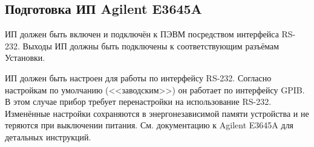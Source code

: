 \documentclass[12pt, a4paper, twocolumn]{book}
\begin{document}
\subsection{Подготовка ИП Agilent E3645A}

ИП должен быть включен и подключён к ПЭВМ посредством интерфейса RS-232. Выходы ИП должны быть подключены к соответствующим разъёмам Установки.

ИП должен быть настроен для работы по интерфейсу RS-232. Согласно настройкам по умолчанию (<<заводским>>) он работает по интерфейсу GPIB. В этом случае прибор требует перенастройки на использование RS-232. Изменённые настройки сохраняются в энергонезависимой памяти устройства и не теряются при выключении питания. См. документацию к Agilent E3645A для детальных инструкций.
\end{document}
